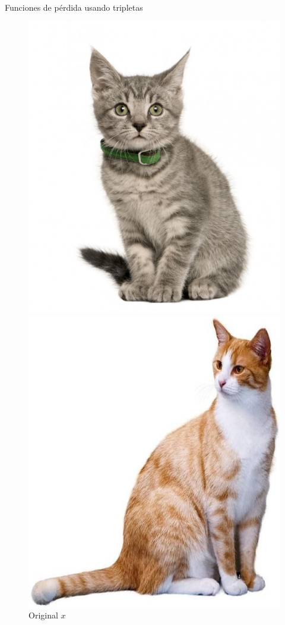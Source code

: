 \documentclass[aspectratio=169]{beamer}
\begin{document}
  \begin{frame}{Funciones de pérdida usando tripletas}
    \begin{figure}[H]%
      \centering
      \includegraphics[scale=0.15]{c1}
      \caption*{Original $x$}\label{fig:cat1}
      \endminipage\hfill
      \centering
      \includegraphics[scale=0.1]{c2}

\end{figure}
\end{frame}
\end{document}
